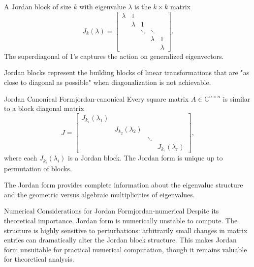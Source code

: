 A Jordan block of size $k$ with eigenvalue $\lambda$ is the $k \times k$ matrix
\[
    J_k(\lambda) = \begin{bmatrix}
        \lambda & 1       &        &         &         \\
                & \lambda & 1      &         &         \\
                &         & \ddots & \ddots  &         \\
                &         &        & \lambda & 1       \\
                &         &        &         & \lambda
    \end{bmatrix}.
\]
The superdiagonal of 1's captures the action on generalized eigenvectors.

Jordan blocks represent the building blocks of linear transformations that are "as close to diagonal as possible" when diagonalization is not achievable.

\begin{definition}{Jordan Canonical Form}{jordan-canonical}
    Every square matrix $A \in \mathbb{C}^{n \times n}$ is similar to a block diagonal matrix
    \[
        J = \begin{bmatrix}
            J_{k_1}(\lambda_1) &                    &        &                    \\
                               & J_{k_2}(\lambda_2) &        &                    \\
                               &                    & \ddots &                    \\
                               &                    &        & J_{k_r}(\lambda_r)
        \end{bmatrix},
    \]
    where each $J_{k_i}(\lambda_i)$ is a Jordan block. The Jordan form is unique up to permutation of blocks.
\end{definition}

The Jordan form provides complete information about the eigenvalue structure and the geometric versus algebraic multiplicities of eigenvalues.

\begin{remark}{Numerical Considerations for Jordan Form}{jordan-numerical}
    Despite its theoretical importance, Jordan form is numerically unstable to compute. The structure is highly sensitive to perturbations: arbitrarily small changes in matrix entries can dramatically alter the Jordan block structure. This makes Jordan form unsuitable for practical numerical computation, though it remains valuable for theoretical analysis.
\end{remark}

